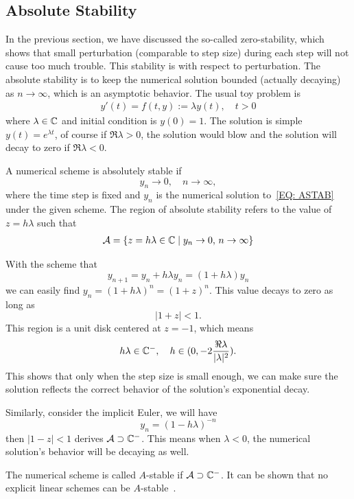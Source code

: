 \subsection{Absolute Stability}
In the previous section, we have discussed the so-called zero-stability, which shows that small perturbation (comparable to step size) during each step will not cause too much trouble. This stability is with respect to perturbation. The absolute stability is to keep the numerical solution bounded (actually decaying) as $n\to \infty$, which is an asymptotic behavior. The usual toy problem is 
\begin{eqnarray}\label{EQ: ASTAB}
    y'(t) = f(t, y):= \lambda y(t),\quad t > 0
\end{eqnarray}
where $\lambda \in \mathbb C$ and initial condition is $y(0)= 1$. The solution is simple $y(t) = e^{\lambda t}$, of course if $\Re \lambda > 0$, the solution would blow and the solution will decay to zero if $\Re \lambda < 0$. 

\begin{definition}
    A numerical scheme is absolutely stable if 
    $$y_n\to 0,\quad n\to \infty,$$
    where the time step is fixed and $y_n$ is the numerical solution to~\eqref{EQ: ASTAB} under the given scheme.  The region of absolute stability refers to the value of $z = h\lambda$ such that 
    \begin{eqnarray}
        \mathcal A = \{ z = h\lambda\in\mathbb C\mid  y_n\to 0,\,n\to \infty\}
    \end{eqnarray}
\end{definition}
\begin{example}
    With the scheme that 
    $$y_{n+1} = y_n + h \lambda y_n = (1 + h\lambda) y_n$$
    we can easily find $y_n = (1 + h\lambda)^n = (1 +z )^n$. This value decays to zero as long as 
    $$|1 + z |< 1.$$
    This region is a unit disk centered at $z= - 1$, which means 
$$h\lambda \in \mathbb C^{-},\quad h\in (0, -2\frac{\Re\lambda}{|\lambda|^2}).$$
This shows that only when the step size is small enough, we can make sure the solution reflects the correct behavior of the solution's exponential decay.
\end{example}
\begin{example}
    Similarly, consider the implicit Euler, we will have 
    $$y_n = (1 - h\lambda)^{-n}$$
    then $|1 - z| < 1$ derives $\mathcal A \supset \mathbb C^{-}$. This means when $\lambda < 0$, the numerical solution's behavior will be decaying as well.
\end{example}
The numerical scheme is called $A$-stable if $\mathcal A\supset\mathbb C^{-}$. It can be shown that no explicit linear schemes can be $A$-stable~\cite{widlund1967note}.







